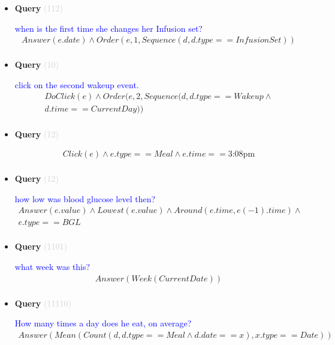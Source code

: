 \documentclass[11pt]{article}
\newcommand{\key}[1]{\textcolor{lightgray}{#1}}
\newcounter{CQuery}
\begin{document}
\begin{itemize}
\item
\textbf{Query\theCQuery} \key{(112)} \addtocounter{CQuery}{1}
\textcolor{blue}{ when is the first time she changes her Infusion set? }
\begin{multline*}
Answer(e.date) \wedge Order(e, 1, Sequence(d, d.type==InfusionSet)) \\ 
\end{multline*}


\item
\textbf{Query\theCQuery} \key{(10)} \addtocounter{CQuery}{1}
\textcolor{blue}{ click on the second wakeup event. }
\begin{multline*}
DoClick(e) \wedge  Order(e, 2, Sequence(d, d.type==Wakeup \wedge \\ 
d.time==CurrentDay)) \\ 
\end{multline*}


\item
\textbf{Query\theCQuery} \key{(12)} \addtocounter{CQuery}{1}
\textcolor{blue}{  }
\begin{multline*}
Click(e) \wedge e.type == Meal \wedge e.time==\mbox{3:08pm} \\ 
\end{multline*}


\item
\textbf{Query\theCQuery} \key{(12)} \addtocounter{CQuery}{1}
\textcolor{blue}{ how low was blood glucose level then? }
\begin{multline*}
Answer(e.value) \wedge Lowest(e.value) \wedge Around(e.time, e(-1).time) \wedge \\ 
e.type==BGL \\ 
\end{multline*}


\item
\textbf{Query\theCQuery} \key{(1101)} \addtocounter{CQuery}{1}
\textcolor{blue}{ what week was this? }
\begin{multline*}
Answer(Week(CurrentDate)) \\ 
\end{multline*}


\item
\textbf{Query\theCQuery} \key{(11110)} \addtocounter{CQuery}{1}
\textcolor{blue}{ How many times a day does he eat, on average? }
\begin{multline*}
Answer(Mean(Count(d, d.type==Meal \wedge d.date==x), x.type==Date)) \\ 
\end{multline*}



\end{itemize}
\end{document}

